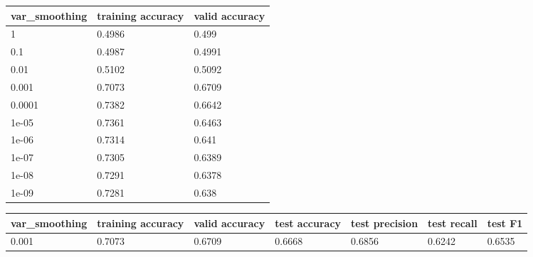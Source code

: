 \documentclass{article}%
\begin{document}
%
\normalsize%
\begin{longtable}{l l l}%
\hline%
var\_smoothing&training accuracy&valid accuracy\\%
\hline%
\endhead%
\hline%
1&0.4986&0.499\\%
0.1&0.4987&0.4991\\%
0.01&0.5102&0.5092\\%
0.001&0.7073&0.6709\\%
0.0001&0.7382&0.6642\\%
1e{-}05&0.7361&0.6463\\%
1e{-}06&0.7314&0.641\\%
1e{-}07&0.7305&0.6389\\%
1e{-}08&0.7291&0.6378\\%
1e{-}09&0.7281&0.638\\%
\hline%
\end{longtable}%
\begin{longtable}{l l l l l l l}%
\hline%
var\_smoothing&training accuracy&valid accuracy&test accuracy&test precision&test recall&test F1\\%
\hline%
\endhead%
\hline%
0.001&0.7073&0.6709&0.6668&0.6856&0.6242&0.6535\\%
\hline%
\end{longtable}%
\end{document}
